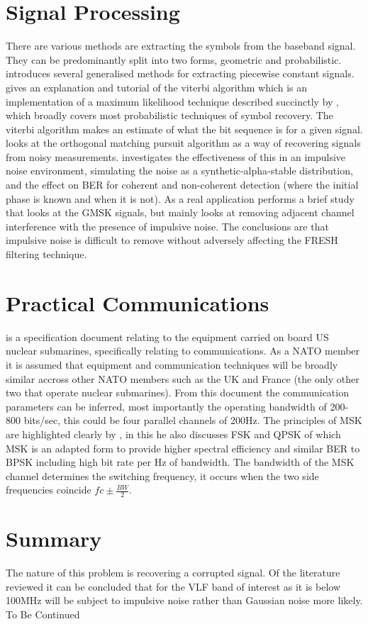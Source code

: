 \section{Signal Processing}
There are various methods are extracting the symbols from the baseband signal. They can be predominantly split into two forms, geometric and probabilistic. \cite{Little2011} introduces several generalised methods for extracting piecewise constant signals. \cite{Forney1973} gives an explanation and tutorial of the viterbi algorithm which is an implementation of a maximum likelihood technique described succinctly by \cite{weisstein}, which broadly covers most probabilistic techniques of symbol recovery. The viterbi algorithm makes an estimate of what the bit sequence is for a given signal. \cite{Shen2015} looks at the orthogonal matching pursuit algorithm as a way of recovering signals from noisy measurements. \cite{Yang2016} investigates the effectiveness of this in an impulsive noise environment, simulating the noise as a synthetic-alpha-stable distribution, and the effect on BER for coherent and non-coherent detection (where the initial phase is known and when it is not). 
As a real application \cite{Adlard1999} performs a brief study that looks at the GMSK signals, but mainly looks at removing adjacent channel interference with the presence of impulsive noise. The conclusions are that impulsive noise is difficult to remove without adversely affecting the FRESH filtering technique.

\section{Practical Communications}
\cite{appendixA} is a specification document relating to the equipment carried on board US nuclear submarines, specifically relating to communications. As a NATO member it is assumed that equipment and communication techniques will be broadly similar accross other NATO members such as the UK and France (the only other two that operate nuclear submarines). From this document the communication parameters can be inferred, most importantly the operating bandwidth of 200-800 bits/sec, this could be four parallel channels of 200Hz. The principles of MSK are highlighted clearly by \cite{Pasupathy1979}, in this he also discusses FSK and QPSK of which MSK is an adapted form to provide higher spectral efficiency and similar BER to BPSK including high bit rate per Hz of bandwidth. 
The bandwidth of the MSK channel determines the switching frequency, it occurs when the two side frequencies coincide $fc\pm\frac{BW}{2}$.

\section{Summary}
The nature of this problem is recovering a corrupted signal. Of the literature reviewed it can be concluded that for the VLF band of interest as it is below 100MHz will be subject to impulsive noise rather than Gaussian noise more likely.  To Be Continued